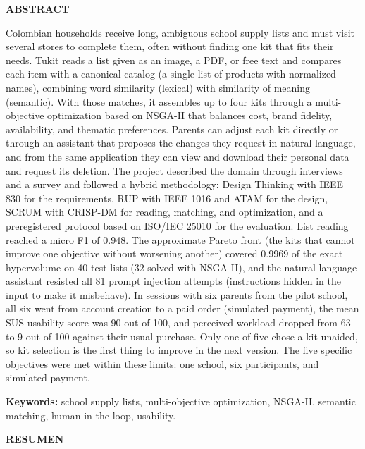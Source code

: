 \begin{center}
    \textbf{ABSTRACT}
\end{center}

\vspace{0.25cm}

Colombian households receive long, ambiguous school supply lists and must visit several stores to complete them, often without finding one kit that fits their needs. Tukit reads a list given as an image, a PDF, or free text and compares each item with a canonical catalog (a single list of products with normalized names), combining word similarity (lexical) with similarity of meaning (semantic). With those matches, it assembles up to four kits through a multi-objective optimization based on NSGA-II that balances cost, brand fidelity, availability, and thematic preferences. Parents can adjust each kit directly or through an assistant that proposes the changes they request in natural language, and from the same application they can view and download their personal data and request its deletion. The project described the domain through interviews and a survey and followed a hybrid methodology: Design Thinking with IEEE 830 for the requirements, RUP with IEEE 1016 and ATAM for the design, SCRUM with CRISP-DM for reading, matching, and optimization, and a preregistered protocol based on ISO/IEC 25010 for the evaluation. List reading reached a micro F1 of 0.948. The approximate Pareto front (the kits that cannot improve one objective without worsening another) covered 0.9969 of the exact hypervolume on 40 test lists (32 solved with NSGA-II), and the natural-language assistant resisted all 81 prompt injection attempts (instructions hidden in the input to make it misbehave). In sessions with six parents from the pilot school, all six went from account creation to a paid order (simulated payment), the mean SUS usability score was 90 out of 100, and perceived workload dropped from 63 to 9 out of 100 against their usual purchase. Only one of five chose a kit unaided, so kit selection is the first thing to improve in the next version. The five specific objectives were met within these limits: one school, six participants, and simulated payment.

\vspace{0.2cm}
\noindent\textbf{Keywords:} school supply lists, multi-objective optimization, NSGA-II, semantic matching, human-in-the-loop, usability.

\begin{center}
    {\textbf{RESUMEN}}
\end{center}

